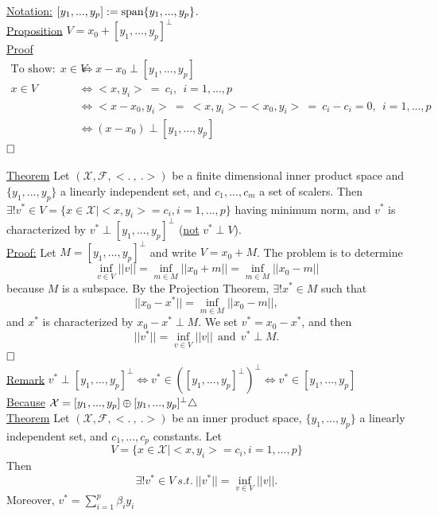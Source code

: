 \documentclass[letterpaper]{article}
\begin{document}
\underline{Notation:} $[y_1, ..., y_p] := \textrm{span} \{ y_1,...,y_p \}$.\\

\underline{Proposition} $V = x_0 + [y_1, ..., y_p]^\perp$\\

\underline{Proof}
$$\begin{aligned}  \text{To show:} ~~ x\in V &\iff x-x_0 \perp [y_1, ..., y_p] \\ x\in V &\iff <x, y_i>~ =~ c_i, ~~ i = 1, ..., p \\
&\iff <x-x_0, y_i>~ = ~<x, y_i> - <x_0, y_i> ~= ~c_i - c_i = 0, ~~ i = 1,...,p\\
&\iff (x-x_0) \perp [y_1, ..., y_p] \end{aligned} $$
$\hfill \square$

\underline{Theorem} Let $(\mathcal{X}, \mathcal{F}, <.~,~.>)$ be a finite dimensional inner product space and $\{y_1,...,y_p\}$ a linearly independent set, and $c_1, ..., c_m$ a set of scalers. Then $\exists ! v^* \in V = \{x \in \mathcal{X} | <x, y_i> = c_i, i = 1, ..., p\}$ having minimum norm, and $v^*$ is characterized by $v^* \perp [y_1, ..., y_p]^\perp$ (\underline{not} $v^* \perp V$).\\

\underline{Proof:} Let $M = [y_1, ..., y_p]^\perp$ and write $V=x_0+M$. The problem is to determine
$$\inf_{v\in V} ||v|| = \inf_{m\in M} ||x_0 + m|| = \inf_{m\in M} ||x_0 - m||$$
because $M$ is a subspace. By the Projection Theorem, $\exists ! x^* \in M$ such that 
$$||x_0 - x^*|| = \inf_{m\in M} ||x_0 - m||,$$
and $x^*$ is characterized by $x_0 - x^* \perp M$. We set $v^* = x_0 - x^*$, and then\\
$$||v^*|| = \inf_{v\in V} ||v||~~ \text{and} ~~v^* \perp M.$$ $\hfill \square$\\

\underline{Remark} $v^* \perp [y_1, ..., y_p]^\perp \iff v^* \in ([y_1, ..., y_p]^\perp)^\perp \iff v^* \in [y_1, ..., y_p]$\\

\underline{Because} $\mathcal{X} = [y_1, ..., y_p] \oplus [y_1, ..., y_p]^\perp \hfill \bigtriangleup$\\

\underline{Theorem} Let $(\mathcal{X}, \mathcal{F}, <.~,~.>)$ be an inner product space, $\{y_1, ... ,y_p \}$ a linearly independent set, and $c_1, ..., c_p$ constants. Let
$$V = \{x \in \mathcal{X} | <x, y_i> = c_i, i = 1,...,p\}$$
Then 
$$\exists ! v^* \in V~ s.t.~ ||v^*|| = \inf_{v\in V} ||v||.$$
Moreover, $v^* = \sum \limits_{i = 1}^{p} \beta_i y_i$
\end{document}
